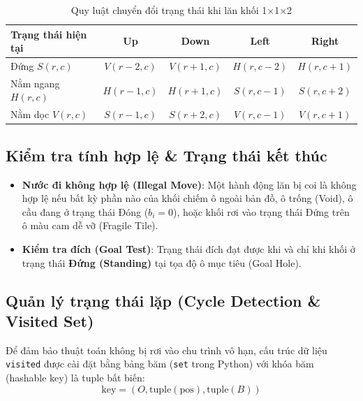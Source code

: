 \documentclass[12pt,a4paper]{article}
\begin{document}
\begin{table}[htbp]
\centering
\caption{Quy luật chuyển đổi trạng thái khi lăn khối 1×1×2}
\label{tab:transition_rules}
\small
\begin{tabular}{lcccc}
\toprule
\textbf{Trạng thái hiện tại} & \textbf{Up} & \textbf{Down} & \textbf{Left} & \textbf{Right} \\
\midrule
Đứng $S(r, c)$ & $V(r-2, c)$ & $V(r+1, c)$ & $H(r, c-2)$ & $H(r, c+1)$ \\
Nằm ngang $H(r, c)$ & $H(r-1, c)$ & $H(r+1, c)$ & $S(r, c-1)$ & $S(r, c+2)$ \\
Nằm dọc $V(r, c)$ & $S(r-1, c)$ & $S(r+2, c)$ & $V(r, c-1)$ & $V(r, c+1)$ \\
\bottomrule
\end{tabular}
\end{table}

\subsection{Kiểm tra tính hợp lệ \& Trạng thái kết thúc}
\begin{itemize}
    \item \textbf{Nước đi không hợp lệ (Illegal Move)}: Một hành động lăn bị coi là không hợp lệ nếu bất kỳ phần nào của khối chiếm ô ngoài bản đồ, ô trống (Void), ô cầu đang ở trạng thái Đóng ($b_i = 0$), hoặc khối rơi vào trạng thái Đứng trên ô màu cam dễ vỡ (Fragile Tile).
    \item \textbf{Kiểm tra đích (Goal Test)}: Trạng thái đích đạt được khi và chỉ khi khối ở trạng thái \textbf{Đứng (Standing)} tại tọa độ ô mục tiêu (Goal Hole).
\end{itemize}

\subsection{Quản lý trạng thái lặp (Cycle Detection \& Visited Set)}
Để đảm bảo thuật toán không bị rơi vào chu trình vô hạn, cấu trúc dữ liệu \texttt{visited} được cài đặt bằng bảng băm (\texttt{set} trong Python) với khóa băm (hashable key) là tuple bất biến:
\begin{equation}
    \text{key} = (O, \text{tuple}(\text{pos}), \text{tuple}(B))
\end{equation}

\end{document}
